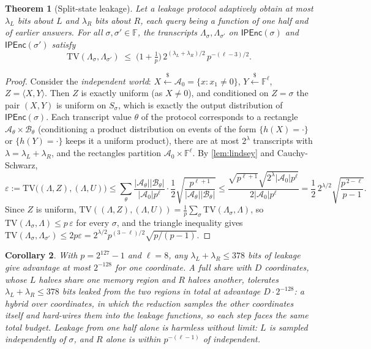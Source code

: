 \documentclass[10.5pt,a4paper]{article}
\theoremstyle{plain}
\newtheorem{theorem}{Theorem}
\newtheorem{corollary}[theorem]{Corollary}
\theoremstyle{definition}
\newcommand{\F}{\mathbb{F}}
\newcommand{\ip}[2]{\langle #1,#2\rangle}
\newcommand{\TV}{\mathrm{TV}}
\newcommand{\Enc}{\mathsf{IPEnc}}
\newcommand{\getsr}{\xleftarrow{\$}}
\begin{document}
\begin{theorem}[Split-state leakage]\label{thm:leakage}
Let a leakage protocol adaptively obtain at most $\lambda_L$ bits about $L$ and $\lambda_R$ bits about $R$, each query being a function of one half and of earlier answers. For all $\sigma,\sigma'\in\F$, the transcripts $\Lambda_\sigma,\Lambda_{\sigma'}$ on $\Enc(\sigma)$ and $\Enc(\sigma')$ satisfy
\[
\TV(\Lambda_\sigma,\Lambda_{\sigma'})\;\le\;\Big(1+\tfrac1p\Big)\,2^{(\lambda_L+\lambda_R)/2}\,p^{-(\ell-3)/2}.
\]
\end{theorem}
\begin{proof}
Consider the \emph{independent world}: $X\getsr\mathcal A_0=\{x:x_1\neq0\}$, $Y\getsr\F^\ell$, $Z=\ip XY$. Then $Z$ is exactly uniform (as $X\neq0$), and conditioned on $Z=\sigma$ the pair $(X,Y)$ is uniform on $S_\sigma$, which is exactly the output distribution of $\Enc(\sigma)$. Each transcript value $\theta$ of the protocol corresponds to a rectangle $\mathcal A_\theta\times\mathcal B_\theta$ (conditioning a product distribution on events of the form $\{h(X)=\cdot\}$ or $\{h(Y)=\cdot\}$ keeps it a uniform product), there are at most $2^{\lambda}$ transcripts with $\lambda=\lambda_L+\lambda_R$, and the rectangles partition $\mathcal A_0\times\F^\ell$. By \cref{lem:lindsey} and Cauchy-Schwarz,
\[
\varepsilon:=\TV\big((\Lambda,Z),(\Lambda,U)\big)\le\sum_\theta\frac{|\mathcal A_\theta||\mathcal B_\theta|}{|\mathcal A_0|p^\ell}\cdot\frac12\sqrt{\frac{p^{\ell+1}}{|\mathcal A_\theta||\mathcal B_\theta|}}\le\frac{\sqrt{p^{\ell+1}}\sqrt{2^\lambda|\mathcal A_0|p^\ell}}{2|\mathcal A_0|p^\ell}=\frac12\,2^{\lambda/2}\sqrt{\frac{p^{\,2-\ell}}{p-1}}.
\]
Since $Z$ is uniform, $\TV((\Lambda,Z),(\Lambda,U))=\frac1p\sum_\sigma\TV(\Lambda_\sigma,\Lambda)$, so $\TV(\Lambda_\sigma,\Lambda)\le p\,\varepsilon$ for every $\sigma$, and the triangle inequality gives $\TV(\Lambda_\sigma,\Lambda_{\sigma'})\le2p\varepsilon=2^{\lambda/2}p^{(3-\ell)/2}\sqrt{p/(p-1)}$.
\end{proof}

\begin{corollary}\label{cor:leakage}
With $p=2^{127}-1$ and $\ell=8$, any $\lambda_L+\lambda_R\le 378$ bits of leakage give advantage at most $2^{-128}$ for one coordinate. A full share with $D$ coordinates, whose $L$ halves share one memory region and $R$ halves another, tolerates $\lambda_L+\lambda_R\le378$ bits leaked from the two regions in total at advantage $D\cdot2^{-128}$: a hybrid over coordinates, in which the reduction samples the other coordinates itself and hard-wires them into the leakage functions, so each step faces the same total budget. Leakage from one half alone is harmless without limit: $L$ is sampled independently of $\sigma$, and $R$ alone is within $p^{-(\ell-1)}$ of independent.
\end{corollary}
\end{document}
